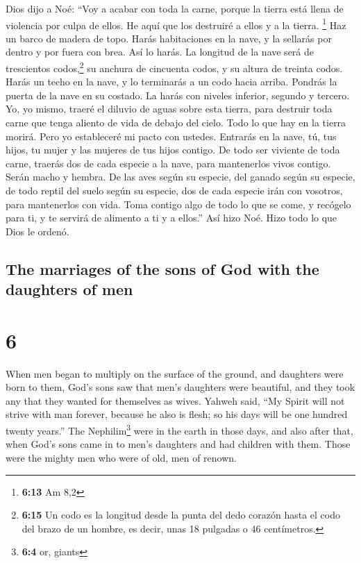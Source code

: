 \begin{paracol}{2}
 Dios dijo a Noé: ``Voy a acabar con toda la carne,
porque la tierra está llena de violencia por culpa de ellos. He aquí que
los destruiré a ellos y a la tierra. \footnote{\textbf{6:13} Am 8,2}
 Haz un barco de madera de topo. Harás habitaciones en la
nave, y la sellarás por dentro y por fuera con brea.  Así
lo harás. La longitud de la nave será de trescientos codos,\footnote{\textbf{6:15}
  Un codo es la longitud desde la punta del dedo corazón hasta el codo
  del brazo de un hombre, es decir, unas 18 pulgadas o 46 centímetros.}
su anchura de cincuenta codos, y su altura de treinta codos.
 Harás un techo en la nave, y lo terminarás a un codo
hacia arriba. Pondrás la puerta de la nave en su costado. La harás con
niveles inferior, segundo y tercero.  Yo, yo mismo,
traeré el diluvio de aguas sobre esta tierra, para destruir toda carne
que tenga aliento de vida de debajo del cielo. Todo lo que hay en la
tierra morirá.  Pero yo estableceré mi pacto con ustedes.
Entrarás en la nave, tú, tus hijos, tu mujer y las mujeres de tus hijos
contigo.  De todo ser viviente de toda carne, traerás dos
de cada especie a la nave, para mantenerlos vivos contigo. Serán macho y
hembra.  De las aves según su especie, del ganado según
su especie, de todo reptil del suelo según su especie, dos de cada
especie irán con vosotros, para mantenerlos con vida. 
Toma contigo algo de todo lo que se come, y recógelo para ti, y te
servirá de alimento a ti y a ellos.''  Así hizo Noé. Hizo
todo lo que Dios le ordenó.

\switchcolumn
\begin{otherlanguage}{english}

\hypertarget{the-marriages-of-the-sons-of-god-with-the-daughters-of-men}{%
\subsection{The marriages of the sons of God with the daughters of
men}\label{the-marriages-of-the-sons-of-god-with-the-daughters-of-men}}

\hypertarget{section-11}{%
\section{6}\label{section-11}}

 When men began to multiply on the surface of the ground,
and daughters were born to them,  God's sons saw that
men's daughters were beautiful, and they took any that they wanted for
themselves as wives.  Yahweh said, ``My Spirit will not
strive with man forever, because he also is flesh; so his days will be
one hundred twenty years.''  The Nephilim\footnote{\textbf{6:4}
  or, giants} were in the earth in those days, and also after that, when
God's sons came in to men's daughters and had children with them. Those
were the mighty men who were of old, men of renown.


\end{otherlanguage}
\end{paracol}
